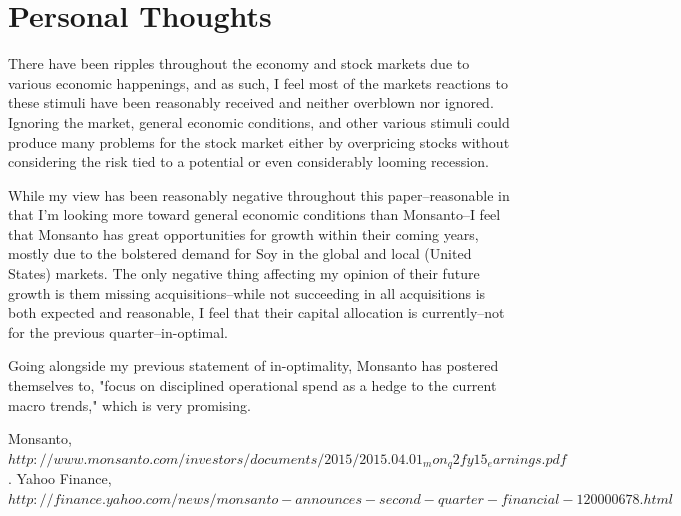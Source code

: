 \documentclass[12pt,letterpaper,english]{article}
\newcommand{\newpar}{\vspace{10mm}\noindent}
\begin{document}
\section{Personal Thoughts}
There have been ripples throughout the economy and stock markets due to various economic happenings, and as such, I feel most of the markets reactions to these stimuli have been reasonably received and neither overblown nor ignored. Ignoring the market, general economic conditions, and other various stimuli could produce many problems for the stock market either by overpricing stocks without considering the risk tied to a potential or even considerably looming recession. 

\newpar
While my view has been reasonably negative throughout this paper--reasonable in that I'm looking more toward general economic conditions than Monsanto--I feel that Monsanto has great opportunities for growth within their coming years, mostly due to the bolstered demand for Soy in the global and local (United States) markets. The only negative thing affecting my opinion of their future growth is them missing acquisitions--while not succeeding in all acquisitions is both expected and reasonable, I feel that their capital allocation is currently--not for the previous quarter--in-optimal.

\newpar
Going alongside my previous statement of in-optimality, Monsanto has postered themselves to, "focus on disciplined operational spend as a hedge to the current macro trends," which is very promising.
\newpage
\begin{thebibliography}{9}
    Monsanto,
    \emph{$http://www.monsanto.com/investors/documents/2015/2015.04.01_mon_q2fy15_earnings.pdf$}.
     Yahoo Finance,
     \emph{$http://finance.yahoo.com/news/monsanto-announces-second-quarter-financial-120000678.html$}
\end{thebibliography}
\end{document}
